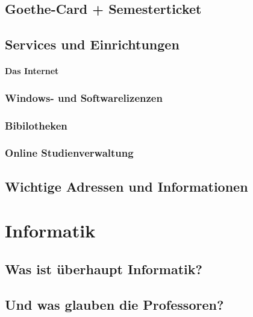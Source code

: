 \documentclass[12pt,a4paper]{scrartcl}
\begin{document}
    \subsection{Goethe-Card + Semesterticket}
    
    
    \subsection{Services und Einrichtungen}
    \paragraph{Das Internet}
    
    \subsubsection*{Windows- und Softwarelizenzen}
    
    \subsubsection*{Bibilotheken}
    
	\subsubsection*{Online Studienverwaltung}
    \newpage
    \subsection{Wichtige Adressen und Informationen}
    
\newpage
\section{Informatik}
    \subsection{Was ist \"uberhaupt Informatik?}
    
    \subsection{Und was glauben die Professoren?}
    
    \newpage
\end{document}
